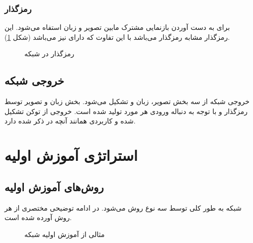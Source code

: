 \subsubsection{رمزگذار
	}
برای به دست آوردن بازنمایی مشترک مابین تصویر و زبان استفاه می‌شود. این رمزگذار مشابه رمزگذار 
می‌باشد با این تفاوت که دارای
نیز می‌باشد (شکل \ref{lxmert-cross-encoder}).

\begin{figure}[H]
	\caption{رمزگذار 
		در شبکه
		 \cite{tan2019lxmert}}
	\label{lxmert-cross-encoder}
\end{figure}
\subsection{خروجی شبکه}
خروجی شبکه
از سه بخش تصویر، زبان و 
تشکیل می‌شود. بخش زبان و تصویر توسط رمزگذار
و با توجه به دنباله ورودی هر مورد تولید شده است. خروجی 
از توکن 
تشکیل شده و کاربردی همانند آنچه در 
ذکر شده دارد.
\section{استراتژی آموزش اولیه 
}
\subsection{ روش‌های آموزش اولیه}

شبکه 
به طور کلی توسط سه نوع روش
می‌شود. در ادامه توضیحی مختصری از هر روش آورده شده است.
\begin{figure}[H]
	\caption{مثالی از آموزش اولیه
	شبکه
	  \cite{tan2019lxmert}}
	\label{lxmert-pretrain}
\end{figure}

